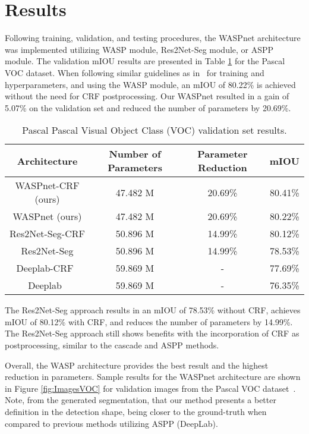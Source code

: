 \documentclass[sensors,article,accept,moreauthors,pdftex]{Definitions/mdpi}
\begin{document}
\section{Results}

Following training, validation, and testing procedures, the WASPnet architecture was implemented utilizing WASP module, Res2Net-Seg module, or ASPP module.
The validation mIOU results are presented in Table \ref{tab:TrainingVOC} for the Pascal VOC dataset.
When following similar guidelines as in~\cite{DeepLab} for training and hyperparameters, and using the WASP module, an mIOU of 80.22\% is achieved without the need for CRF postprocessing. Our WASPnet resulted in a gain of 5.07\% on the validation set and reduced the number of parameters by 20.69\%.


\begin{table}[H]
\caption{Pascal Pascal Visual Object Class (VOC) validation set results.}
\centering
\begin{tabular}{cccc}
\toprule
\textbf{Architecture}& \textbf{Number of Parameters} & \textbf{Parameter Reduction} & \textbf{mIOU}\\
\midrule
WASPnet-CRF (ours)&47.482 M&20.69\% &80.41\%\\WASPnet (ours)&47.482 M&20.69\%&80.22\%\\
Res2Net-Seg-CRF&50.896 M&14.99\%&80.12\%\\
Res2Net-Seg&50.896 M&14.99\%&78.53\%\\
Deeplab-CRF~\cite{DeepLab}&59.869 M&-&77.69\%\\
Deeplab~\cite{DeepLab}&59.869 M&-&76.35\%\\
\bottomrule
\end{tabular}
\label{tab:TrainingVOC}
\end{table}

The Res2Net-Seg approach results in an mIOU of 78.53\% without CRF, achieves  mIOU  of 80.12\% with CRF, and reduces the number of parameters by 14.99\%. The Res2Net-Seg approach still shows benefits with the incorporation of CRF as postprocessing, similar to the cascade and ASPP methods.

Overall, the WASP architecture provides the best result and the highest reduction in parameters.
Sample results for the WASPnet architecture are shown in Figure \ref{fig:ImagesVOC} for validation images from the Pascal VOC dataset~\cite{Pascal}. Note, from the generated segmentation, that our method presents a better definition in the detection shape, being closer to the ground-truth when compared to previous methods utilizing ASPP (DeepLab).
\end{document}
